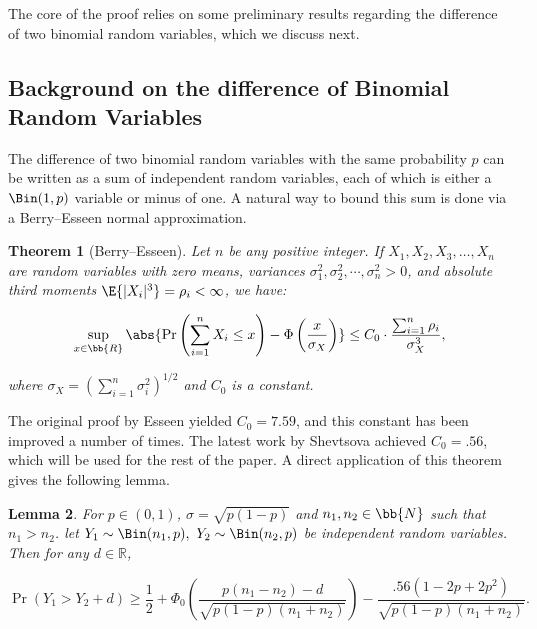 \documentclass[11pt]{article}
\numberwithin{equation}{section}
\newtheorem{theorem}{Theorem}[section]
\newtheorem{lemma}[theorem]{Lemma}
\theoremstyle{definition}
\theoremstyle{plain}
\newcommand{\R}{\mathbb R}
\begin{document}
			The core of the proof relies on some preliminary results regarding the difference of two binomial random variables, which we discuss next.
			
			
			\subsection{Background on  %
				the  %
				difference of Binomial Random Variables}
			
			The difference of two binomial random variables with the same probability $p$ can be written as a sum of independent random variables, each of which is either a $\Bin(1, p)$ variable or minus of one. A natural way to bound this sum is done via a Berry--Esseen normal approximation.
			
			\begin{theorem}[Berry--Esseen] \label{thm:esseen}
				Let $n$ be any positive integer. If $X_1, X_2, X_3, \ldots, X_n$ are random variables with zero means, variances $\sigma_1^2, \sigma_2^2, \cdots, \sigma_n^2 > 0$, and absolute third moments $\E{|X_i|^3} = \rho_i < \infty$, we have:
				\begin{linenomath}\begin{equation*} \label{BE1}
						\sup_{x\in \bb{R}}\abs{\Pr\left( \sum_{i=1}^nX_i \le x \right) - \Phi\left(\frac{x}{\sigma_X}\right)} \le C_0\cdot\frac{\sum_{i=1}^n\rho_i}{\sigma_X^3},
				\end{equation*}\end{linenomath}
				where $\sigma_X = \left(\sum_{i=1}^n\sigma_i^2\right)^{1/2}$ and $C_0$ is a constant.
			\end{theorem}
			
			\noindent The original proof by Esseen \cite{esseen} yielded  $C_0 = 7.59$, and this constant has been improved a number of times. The latest work by Shevtsova \cite{shevtsova} achieved  $C_0 = .56$, which will be used for the rest of the paper. A direct application of this theorem gives the following lemma.
			
			\begin{lemma} \label{thm:diff of binom r.v. gen.}
				For $p\in (0, 1)$, $\sigma = \sqrt{p(1-p)}$ and $n_1, n_2 \in \bb{N}$ such that $n_1 > n_2$.
				let $Y_1 \sim \Bin(n_1, p), \ Y_2 \sim \Bin(n_2, p)$ be independent random variables.
				Then for any $d\in \R$,
				\begin{linenomath}\begin{equation*}
						\Pr\left(Y_1 > Y_2 + d\right) \ge \frac{1}{2} + \Phi_0\left(\frac{p(n_1 - n_2) - d}{\sqrt{p(1 - p)(n_1 + n_2)}}\right) - \frac{.56\left(1 - 2p + 2p^2\right)}{\sqrt{p(1 - p)(n_1 + n_2)}}.
				\end{equation*}\end{linenomath}
			\end{lemma}
			
\end{document}
